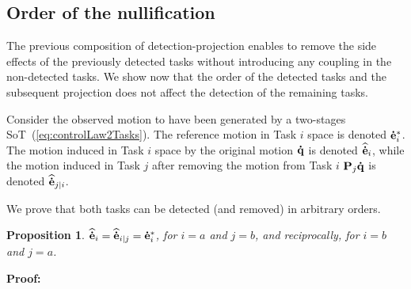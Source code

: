 \documentclass[journal]{IEEEtran}
\newtheorem{proposition}[theorem]{Proposition}
\begin{document}
%
%

\subsection{Order of the nullification}

The previous composition of detection-projection enables to remove the side effects of the previously detected tasks without introducing any coupling in the non-detected tasks. We show now that the order of the detected tasks and the subsequent projection does not affect the detection of the remaining tasks.

Consider the observed motion to have been generated by a two-stages
SoT~(\ref{eq:controlLaw2Tasks}). The reference motion in Task $i$
space is denoted ${\mathbf{\dot{e}}}_{i}^*$. The motion induced in Task $i$ space by the
original motion ${\mathbf{\dot{q}}}$ is denoted ${\mathbf{\widehat{\dot{e}}}}_{i}$, while the motion induced in
Task $j$ after removing the motion from Task $i$ ${\mathbf{P}}_{j} {\mathbf{\dot{q}}}$ is denoted ${\mathbf{\widehat{\dot{e}}}}_{j|i}$.

We prove that both tasks can be detected (and removed)
in arbitrary orders. 

\begin{proposition}
${\mathbf{\widehat{\dot{e}}}}_{i} = {\mathbf{\widehat{\dot{e}}}}_{i|j} = {\mathbf{\dot{e}}}_{i}^*$, for $i=a$ and $j=b$, and reciprocally, for $i=b$ and $j=a$.
\end{proposition}
\noindent\textbf{Proof:}
\end{document}
